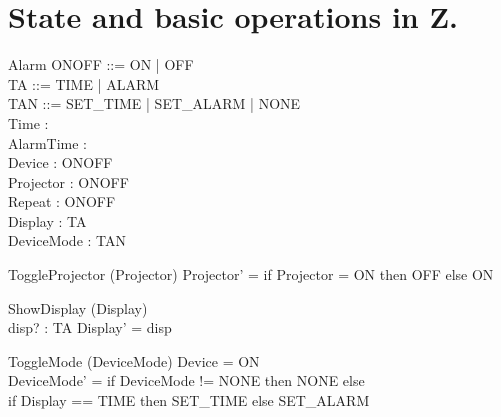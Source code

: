 \documentclass[Main_Assignment2]{subfiles}
\begin{document}
\section{State and basic operations in Z.}



\begin{schema}{Alarm}
ONOFF ::= ON | OFF  \\
TA ::= TIME | ALARM \\
TAN ::= SET\_TIME | SET\_ALARM | NONE \\
Time :  \\
AlarmTime :  \\
Device : ONOFF\\
Projector : ONOFF \\
Repeat : ONOFF \\
Display : TA\\
DeviceMode : TAN
\end{schema}




\begin{schema}{ToggleProjector} %
\Delta (Projector) 
\where
Projector' = if\; Projector = ON\; then\; OFF\; else\; ON 
\end{schema}


\begin{schema}{ShowDisplay} %
\Delta (Display)\\
disp? : TA
\where
Display' = disp
\end{schema}


\begin{schema}{ToggleMode} %
\Delta (DeviceMode) 
\where
Device = ON\\
DeviceMode' = if\; DeviceMode\; != NONE \; then\; NONE\; else\; \\
\hspace{20pt} if\; Display == TIME\; then\; SET\_TIME\; else\; SET\_ALARM
\end{schema}
\end{document}
